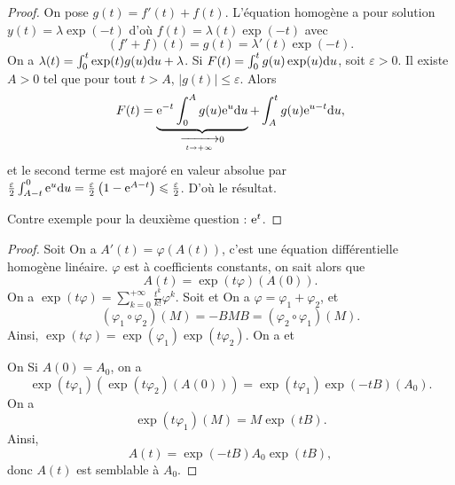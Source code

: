 \documentclass[12pt]{article}
\begin{document}
\begin{proof}
	On pose $g(t)=f'(t)+f(t)$. L'équation homogène a pour solution $y(t)=\lambda\exp(-t)$ d'où $f(t)=\lambda(t)\exp(-t)$ avec 
	\begin{equation*}
		(f'+f)(t)=g(t)=\lambda'(t)\exp(-t).
	\end{equation*}
	On a $\lambda(t)=\int_{0}^{t}\exp(t) g(u)\mathrm{d} u+\lambda$. Si $F(t)=\int_{0}^{t}g(u)\exp(u)\mathrm{d} u$, soit $\varepsilon>0$. Il existe $A>0$ tel que pour tout $t>A$, $\left\lvert g(t)\right\rvert\leqslant\varepsilon$. Alors 
	\begin{equation*}
		F(t)=\underbrace{\mathrm{e}^{-t}\int_{0}^{A}g(u)\mathrm{e}^{u}\mathrm{d} u}_{\xrightarrow[t\to+\infty]{}0}+\int_{A}^{t}g(u)\mathrm{e}^{u-t}\mathrm{d} u,
	\end{equation*}
	et le second terme est majoré en valeur absolue par $\frac{\varepsilon}{2}\int_{A-t}^{0}\mathrm{e}^{u}\mathrm{d} u=\frac{\varepsilon}{2}\left(1-\mathrm{e}^{A-t}\right)\leqslant\frac{\varepsilon}{2}$. D'où le résultat.

	Contre exemple pour la deuxième question : $\mathrm{e}^{t}$.
\end{proof}

\begin{proof}
	Soit 
	On a $A'(t)=\varphi(A(t))$, c'est une équation différentielle homogène linéaire. $\varphi$ est à coefficients constants, on sait alors que 
	\begin{equation*}
		A(t)=\exp(t\varphi)(A(0)).
	\end{equation*}
	On a $\exp(t\varphi)=\sum_{k=0}^{+\infty}\frac{t^{k}}{k!}\varphi^{k}$. Soit  et 
	On a $\varphi=\varphi_1+\varphi_2$, et 
	\begin{equation*}
		\left(\varphi_1\circ\varphi_2\right)(M)=-BMB=(\varphi_2\circ\varphi_1)(M).
	\end{equation*}
	Ainsi, $\exp(t\varphi)=\exp(\varphi_1)\exp(t\varphi_2)$. On a  et  

	On Si $A(0)=A_0$, on a
	\begin{equation*}
		\exp(t\varphi_1)\left(\exp(t\varphi_2)(A(0))\right)=\exp(t\varphi_1)\exp(-tB)(A_0).
	\end{equation*}
	On a 
	\begin{equation*}
		\exp(t\varphi_{1})(M)=M\exp(tB).
	\end{equation*}
	Ainsi,
	\begin{equation*}
		A(t)=\exp(-tB)A_0\exp(tB),
	\end{equation*}
	donc $A(t)$ est semblable à $A_0$.
\end{proof}
\end{document}
